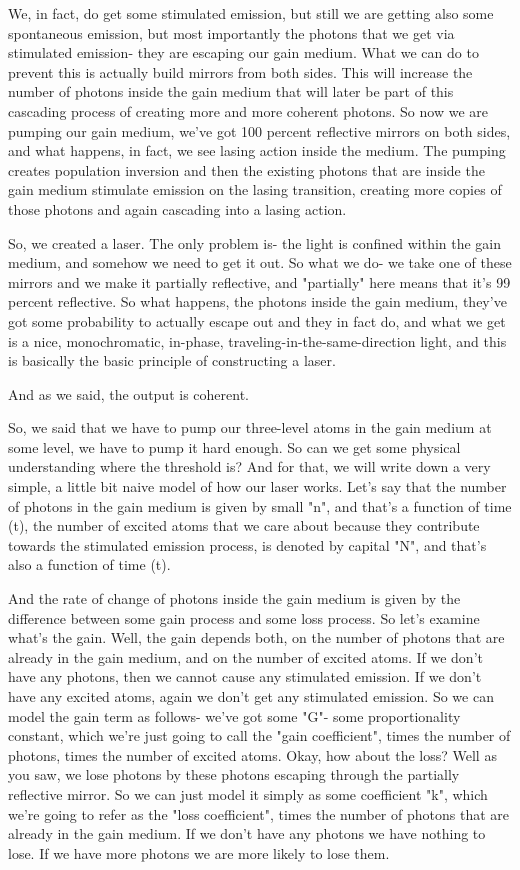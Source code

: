 We, in fact, do get some stimulated emission, but still we are getting also some spontaneous emission, but most importantly the photons that we get via stimulated emission- they are escaping our gain medium. What we can do to prevent this is actually build mirrors from both sides. This will increase the number of photons inside the gain medium that will later be part of this cascading process of creating more and more coherent photons. So now we are pumping our gain medium, we've got 100 percent reflective mirrors on both sides, and what happens, in fact, we see lasing action inside the medium. The pumping creates population inversion and then the existing photons that are inside the gain medium stimulate emission on the lasing transition, creating more copies of those photons and again cascading into a lasing action.

So, we created a laser. The only problem is- the light is confined within the gain medium, and somehow we need to get it out. So what we do- we take one of these mirrors and we make it partially reflective, and "partially" here means that it's 99 percent reflective. So what happens, the photons inside the gain medium, they've got some probability to actually escape out and they in fact do, and what we get is a nice, monochromatic, in-phase, traveling-in-the-same-direction light, and this is basically the basic principle of constructing a laser.

And as we said, the output is coherent.

So, we said that we have to pump our three-level atoms in the gain medium at some level, we have to pump it hard enough. So can we get some physical understanding where the threshold is? And for that, we will write down a very simple, a little bit naive model of how our laser works. Let's say that the number of photons in the gain medium is given by small "n", and that's a function of time (t), the number of excited atoms that we care about because they contribute towards the stimulated emission process, is denoted by capital "N", and that's also a function of time (t).

And the rate of change of photons inside the gain medium is given by the difference between some gain process and some loss process. So let's examine what's the gain. Well, the gain depends both, on the number of photons that are already in the gain medium, and on the number of excited atoms. If we don't have any photons, then we cannot cause any stimulated emission. If we don't have any excited atoms, again we don't get any stimulated emission. So we can model the gain term as follows- we've got some "G"- some proportionality constant, which we're just going to call the "gain coefficient", times the number of photons, times the number of excited atoms. Okay, how about the loss? Well as you saw, we lose photons by these photons escaping through the partially reflective mirror. So we can just model it simply as some coefficient "k", which we're going to refer as the "loss coefficient", times the number of photons that are already in the gain medium. If we don't have any photons we have nothing to lose. If we have more photons we are more likely to lose them.


